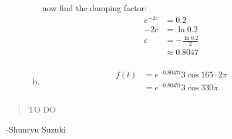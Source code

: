 \documentclass{exam}
\begin{document}
\begin{description}
\begin{enumerate}[(a)]
            now find the damping factor:
            \begin{align*}
              e^{-2c} & = 0.2 \\
              -2c     & = \ln 0.2 \\
              c       & = - \frac{\ln 0.2}{2} \\
                      & \approx \boxed{ 0.8047 } \\
            \end{align*}

          \item 
            \begin{align*}
              f(t) & = e^{-0.8047t} 3 \cos 165 \cdot 2 \pi \\
                   & = \boxed{ e^{-0.8047t} 3 \cos 330 \pi } \\
            \end{align*}

        \end{enumerate}

    \end{description}

  \else
    \vspace{1 cm}
    \begin{quote}
      \begin{em}
        TO DO
      \end{em}
    \end{quote}
    \hspace{1 cm} --Shunryu Suzuki
  \fi
\end{document}
